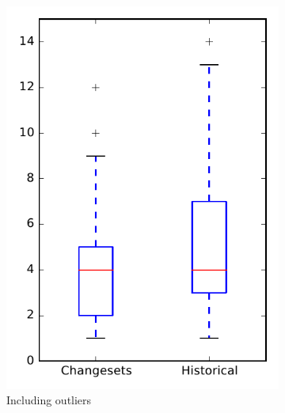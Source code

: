 
\begin{figure}
    \centering
    \begin{subfigure}{.4\textwidth}
        \centering
        \includegraphics[height=0.4\textheight]{figures/dit/rq2_zookeeper}
        \caption{Including outliers}\label{fig:dit:rq2:zookeeper_outlier}
    \end{subfigure}%
    \begin{subfigure}{.4\textwidth}
        \centering

\end{subfigure}
\end{figure}
